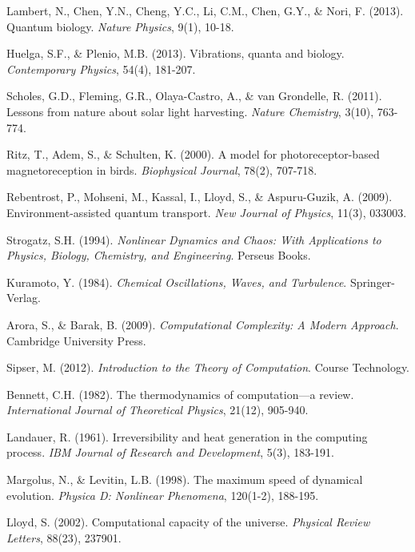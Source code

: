 \documentclass[12pt,a4paper]{article}
\theoremstyle{definition}
\begin{document}
{\begin{thebibliography}{99}
Lambert, N., Chen, Y.N., Cheng, Y.C., Li, C.M., Chen, G.Y., \& Nori, F. (2013). Quantum biology. \emph{Nature Physics}, 9(1), 10-18.

Huelga, S.F., \& Plenio, M.B. (2013). Vibrations, quanta and biology. \emph{Contemporary Physics}, 54(4), 181-207.

Scholes, G.D., Fleming, G.R., Olaya-Castro, A., \& van Grondelle, R. (2011). Lessons from nature about solar light harvesting. \emph{Nature Chemistry}, 3(10), 763-774.

Ritz, T., Adem, S., \& Schulten, K. (2000). A model for photoreceptor-based magnetoreception in birds. \emph{Biophysical Journal}, 78(2), 707-718.

Rebentrost, P., Mohseni, M., Kassal, I., Lloyd, S., \& Aspuru-Guzik, A. (2009). Environment-assisted quantum transport. \emph{New Journal of Physics}, 11(3), 033003.

Strogatz, S.H. (1994). \emph{Nonlinear Dynamics and Chaos: With Applications to Physics, Biology, Chemistry, and Engineering}. Perseus Books.

Kuramoto, Y. (1984). \emph{Chemical Oscillations, Waves, and Turbulence}. Springer-Verlag.

Arora, S., \& Barak, B. (2009). \emph{Computational Complexity: A Modern Approach}. Cambridge University Press.

Sipser, M. (2012). \emph{Introduction to the Theory of Computation}. Course Technology.

Bennett, C.H. (1982). The thermodynamics of computation—a review. \emph{International Journal of Theoretical Physics}, 21(12), 905-940.

Landauer, R. (1961). Irreversibility and heat generation in the computing process. \emph{IBM Journal of Research and Development}, 5(3), 183-191.

Margolus, N., \& Levitin, L.B. (1998). The maximum speed of dynamical evolution. \emph{Physica D: Nonlinear Phenomena}, 120(1-2), 188-195.

Lloyd, S. (2002). Computational capacity of the universe. \emph{Physical Review Letters}, 88(23), 237901.


\end{thebibliography}}
\end{document}
